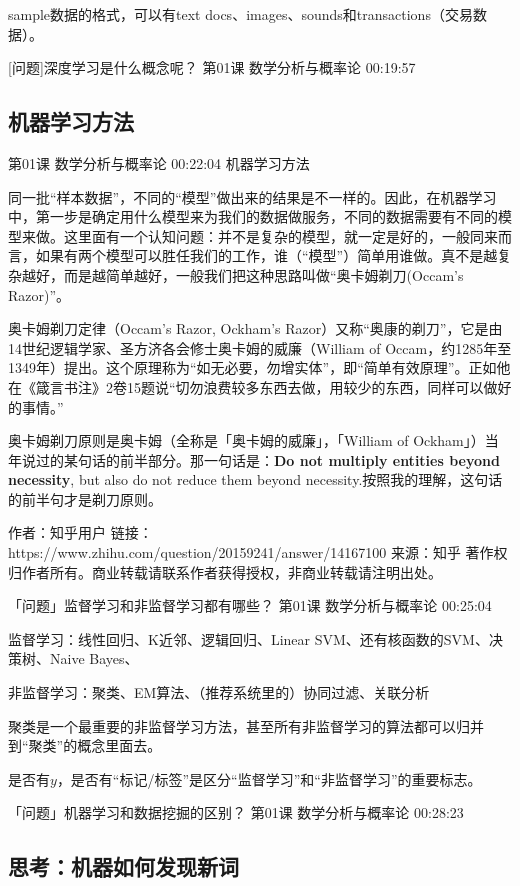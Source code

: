 \documentclass[UTF8]{ctexbook}
\begin{document}
sample数据的格式，可以有text docs、images、sounds和transactions（交易数据）。

[问题]深度学习是什么概念呢？ 第01课 数学分析与概率论 00:19:57

\subsection{机器学习方法}

第01课 数学分析与概率论 00:22:04 机器学习方法

同一批“样本数据”，不同的“模型”做出来的结果是不一样的。因此，在机器学习中，第一步是确定用什么模型来为我们的数据做服务，不同的数据需要有不同的模型来做。这里面有一个认知问题：并不是复杂的模型，就一定是好的，一般同来而言，如果有两个模型可以胜任我们的工作，谁（“模型”）简单用谁做。真不是越复杂越好，而是越简单越好，一般我们把这种思路叫做“奥卡姆剃刀(Occam's Razor)”。

奥卡姆剃刀定律（Occam's Razor, Ockham's Razor）又称“奥康的剃刀”，它是由14世纪逻辑学家、圣方济各会修士奥卡姆的威廉（William of Occam，约1285年至1349年）提出。这个原理称为“如无必要，勿增实体”，即“简单有效原理”。正如他在《箴言书注》2卷15题说“切勿浪费较多东西去做，用较少的东西，同样可以做好的事情。”

奥卡姆剃刀原则是奥卡姆（全称是「奥卡姆的威廉」，「William of Ockham」）当年说过的某句话的前半部分。那一句话是：\textbf{Do not multiply entities beyond necessity}, but also do not reduce them beyond necessity.按照我的理解，这句话的前半句才是剃刀原则。

作者：知乎用户
链接：https://www.zhihu.com/question/20159241/answer/14167100
来源：知乎
著作权归作者所有。商业转载请联系作者获得授权，非商业转载请注明出处。

「问题」监督学习和非监督学习都有哪些？ 第01课 数学分析与概率论 00:25:04

监督学习：线性回归、K近邻、逻辑回归、Linear SVM、还有核函数的SVM、决策树、Naive Bayes、

非监督学习：聚类、EM算法、（推荐系统里的）协同过滤、关联分析

聚类是一个最重要的非监督学习方法，甚至所有非监督学习的算法都可以归并到“聚类”的概念里面去。

是否有$y$，是否有“标记/标签”是区分“监督学习”和“非监督学习”的重要标志。

「问题」机器学习和数据挖掘的区别？ 第01课 数学分析与概率论 00:28:23


\subsection{思考：机器如何发现新词}
\end{document}
